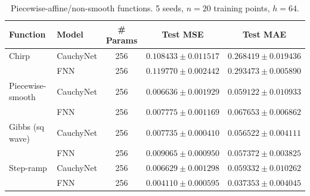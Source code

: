 \begin{table}[ht]\centering
\caption{Piecewise-affine/non-smooth functions. 5 seeds, $n=20$ training points, $h=64$.}
\label{tab:piecewise}
\begin{tabular}{llccc}
\toprule
Function & Model & \# Params & Test MSE & Test MAE \\
\midrule
Chirp & CauchyNet & 256 & $0.108433 \pm 0.011517$ & $0.268419 \pm 0.019436$ \\
 & FNN & 256 & $0.119770 \pm 0.002442$ & $0.293473 \pm 0.005890$ \\
\midrule
Piecewise-smooth & CauchyNet & 256 & $0.006636 \pm 0.001929$ & $0.059122 \pm 0.010933$ \\
 & FNN & 256 & $0.007775 \pm 0.001169$ & $0.067653 \pm 0.006862$ \\
\midrule
Gibbs (sq wave) & CauchyNet & 256 & $0.007735 \pm 0.000410$ & $0.056522 \pm 0.004111$ \\
 & FNN & 256 & $0.009065 \pm 0.000950$ & $0.057372 \pm 0.003825$ \\
\midrule
Step-ramp & CauchyNet & 256 & $0.006629 \pm 0.001298$ & $0.059332 \pm 0.010262$ \\
 & FNN & 256 & $0.004110 \pm 0.000595$ & $0.037353 \pm 0.004045$ 
\bottomrule
\end{tabular}
\end{table}